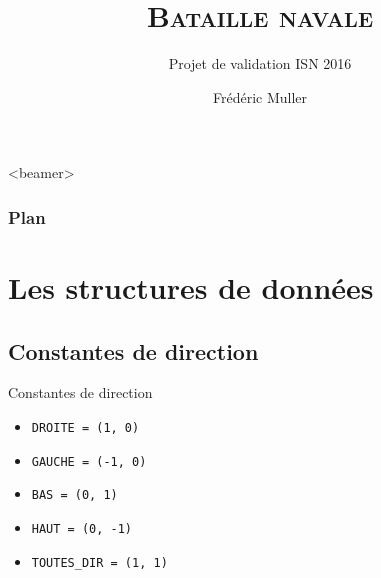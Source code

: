 

\usepackage{pmboxdraw}
\usepackage{newunicodechar}




\title[Bataille navale]{\textsc{Bataille navale}}
\subtitle{Projet de validation ISN 2016}
\author{Frédéric Muller}
\date{}

\AtBeginSubsection[]
{
  \begin{frame}<beamer>
    \frametitle{Plan}
    \tableofcontents[currentsection,currentsubsection,    subsubsectionstyle=hide]
  \end{frame}
}





\begin{frame}
\titlepage
\end{frame}

\section{Les structures de données}
\subsection{Constantes de direction}
\begin{frame}{Constantes de direction}
\begin{itemize}
\item \texttt{DROITE = (1, 0)} 
\item \texttt{GAUCHE = (-1, 0)}
\item \texttt{BAS = (0, 1)}
\item \texttt{HAUT = (0, -1)}
\item \texttt{TOUTES\_DIR = (1, 1)}
\end{itemize}
\end{frame}

